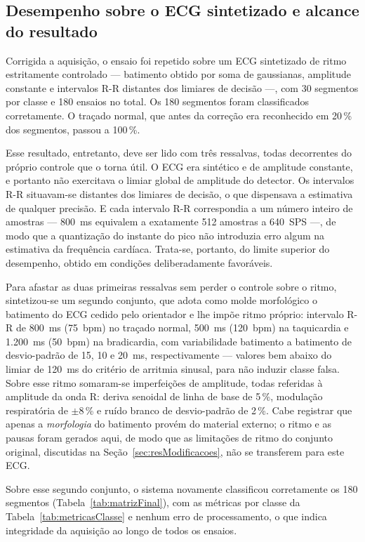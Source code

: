 \subsection{Desempenho sobre o ECG sintetizado e alcance do resultado}
\label{sec:resBateriaControlada}

Corrigida a aquisição, o ensaio foi repetido sobre um \acs{ECG} sintetizado de ritmo
estritamente controlado --- batimento obtido por soma de gaussianas, amplitude constante e
intervalos R-R distantes dos limiares de decisão ---, com 30 segmentos por classe e 180
ensaios no total. Os 180 segmentos foram classificados corretamente. O traçado normal, que
antes da correção era reconhecido em 20\,\% dos segmentos, passou a 100\,\%.

Esse resultado, entretanto, deve ser lido com três ressalvas, todas decorrentes do próprio
controle que o torna útil. O \acs{ECG} era sintético e de amplitude constante, e portanto
não exercitava o limiar global de amplitude do detector. Os intervalos R-R situavam-se
distantes dos limiares de decisão, o que dispensava a estimativa de qualquer precisão. E
cada intervalo R-R correspondia a um número inteiro de amostras --- 800~ms equivalem a
exatamente 512 amostras a 640~SPS ---, de modo que a quantização do instante do pico não
introduzia erro algum na estimativa da frequência cardíaca. Trata-se, portanto, do limite
superior do desempenho, obtido em condições deliberadamente favoráveis.

Para afastar as duas primeiras ressalvas sem perder o controle sobre o ritmo, sintetizou-se
um segundo conjunto, que adota como molde morfológico o batimento do \acs{ECG} cedido pelo
orientador e lhe impõe ritmo próprio: intervalo R-R de 800~ms (75~bpm) no traçado normal,
500~ms (120~bpm) na taquicardia e 1.200~ms (50~bpm) na bradicardia, com variabilidade
batimento a batimento de desvio-padrão de 15, 10 e 20~ms, respectivamente --- valores bem
abaixo do limiar de 120~ms do critério de arritmia sinusal, para não induzir classe falsa.
Sobre esse ritmo somaram-se imperfeições de amplitude, todas referidas à amplitude da onda
R: deriva senoidal de linha de base de 5\,\%, modulação respiratória de $\pm$8\,\% e ruído
branco de desvio-padrão de 2\,\%. Cabe registrar que apenas a \emph{morfologia} do batimento
provém do material externo; o ritmo e as pausas foram gerados aqui, de modo que as
limitações de ritmo do conjunto original, discutidas na Seção~\ref{sec:resModificacoes}, não
se transferem para este \acs{ECG}.

Sobre esse segundo conjunto, o sistema novamente classificou corretamente os 180 segmentos
(Tabela~\ref{tab:matrizFinal}), com as métricas por classe da
Tabela~\ref{tab:metricasClasse} e nenhum erro de processamento, o que indica integridade da
aquisição ao longo de todos os ensaios.

